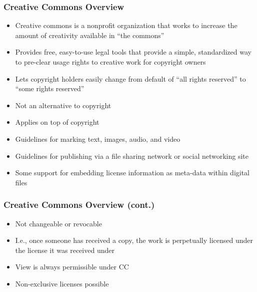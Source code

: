 \documentclass[mathserif,xcolor=dvipsnames,handout]{beamer}
\begin{document}
    \begin{frame}[t]
        \frametitle{Creative Commons Overview}
        \begin{itemize}
            \item<2-> Creative commons is a nonprofit organization that works to
                  increase the amount of creativity available in ``the commons''
            \item<3-> Provides free, easy-to-use legal tools that provide a simple,
                  standardized way to pre-clear usage rights to creative work for
                  copyright owners
            \item<4-> Lets copyright holders easily change from default of ``all
                  rights reserved'' to ``some rights reserved''
            \item<5-> Not an alternative to copyright
            \item<6-> Applies on top of copyright
            \item<7-> Guidelines for marking text, images, audio, and video
            \item<8-> Guidelines for publishing via a file sharing network or
                  social networking site
            \item<9-> Some support for embedding license information as meta-data
                  within digital files
        \end{itemize}
    \end{frame}

    \begin{frame}[t]
        \frametitle{Creative Commons Overview (cont.)}
        \begin{itemize}
            \item<2-> Not changeable or revocable
            \item<3-> I.e., once someone has received a copy, the work is
                  perpetually licensed under the license it was received under
            \item<4-> View is always permissible under CC
            \item<5-> Non-exclusive licenses possible
        \end{itemize}
    \end{frame}
\end{document}

